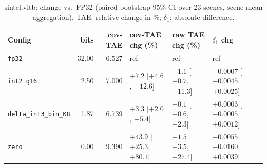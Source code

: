 \begin{table}[t]
\centering
\small
\caption{sintel.vitb: change vs.\ FP32 (paired bootstrap 95\% CI over 23 scenes, scene-mean aggregation). TAE: relative change in \%; $\delta_1$: absolute difference.}
\label{tab:boot_sintel_vitb_sm}
\begin{tabular}{lrrlll}
\toprule
Config & bits & cov-TAE & cov-TAE chg (\%) & raw TAE chg (\%) & $\delta_1$ chg \\
\midrule
\texttt{fp32} & 32.00 & 6.527 & ref & ref & ref \\
\texttt{int2\_g16} & 2.50 & 7.000 & $+7.2$ [$+4.6$, $+12.6$] & $+1.1$ [$-0.7$, $+11.3$] & $-0.0007$ [$-0.0045$, $+0.0025$] \\
\texttt{delta\_int3\_bin\_K8} & 1.87 & 6.739 & $+3.3$ [$+2.0$, $+5.4$] & $-0.1$ [$-0.6$, $+2.3$] & $+0.0003$ [$-0.0005$, $+0.0012$] \\
\texttt{zero} & 0.00 & 9.390 & $+43.9$ [$+25.3$, $+80.1$] & $+1.5$ [$-3.5$, $+27.4$] & $-0.0055$ [$-0.0160$, $+0.0039$] \\
\bottomrule
\end{tabular}
\end{table}
